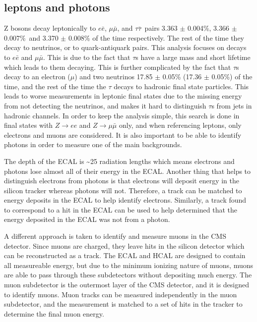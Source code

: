 \subsection{leptons and photons}
\label{ssec:lepsandphots}
Z bosons decay leptonically to $e\bar{e}$, $\mu\bar{\mu}$, and $\tau\bar{\tau}$~pairs 3.363 $\pm$ 0.004\%, 3.366 $\pm$ 0.007\%\ and 3.370 $\pm$ 0.008\% of the time respectively.
The rest of the time they decay to neutrinos, or to quark-antiquark pairs.
This analysis focuses on decays to $e\bar{e}$ and $\mu\bar{\mu}$.
This is due to the fact that $\tau$s have a large mass and short lifetime which leads to them decaying.
This is further complicated by the fact that $\tau$s decay to an electron ($\mu$) and two neutrinos 17.85 $\pm$ 0.05\% (17.36 $\pm$ 0.05\%) of the time,
and the rest of the time the $\tau$ decays to hadronic final state particles.
This leads to worse measurements in leptonic final states due to the missing energy from not detecting the neutrinos,
and makes it hard to distinguish $\tau$s from jets in hadronic channels.
In order to keep the analysis simple, this search is done in final states with $Z\rightarrow ee$ and $Z\rightarrow\mu\bar{\mu}$ only,
and when referencing leptons, only electrons and muons are considered.
It is also important to be able to identify photons in order to measure one of the main backgrounds.

The depth of the ECAL is \textasciitilde{}25 radiation lengths which means electrons and photons lose almost all of their energy in the ECAL.
Another thing that helps to distinguish electrons from photons is that electrons will deposit energy in the silicon tracker whereas photons will not.
Therefore, a track can be matched to energy deposits in the ECAL to help identify electrons.
Similarly, a track found to correspond to a hit in the ECAL can be used to help determined that the energy deposited in the ECAL was not from a photon.

A different approach is taken to identify and measure muons in the CMS detector.
Since muons are charged, they leave hits in the silicon detector which can be reconstructed as a track.
The ECAL and HCAL are designed to contain all measureable energy,
but due to the minimum ionizing nature of muons, muons are able to pass through these subdetectors without depositing much energy.
The muon subdetector is the outermost layer of the CMS detector, and it is designed to identify muons.
Muon tracks can be measured independently in the muon subdetector,
and the measurement is matched to a set of hits in the tracker to determine the final muon energy.

